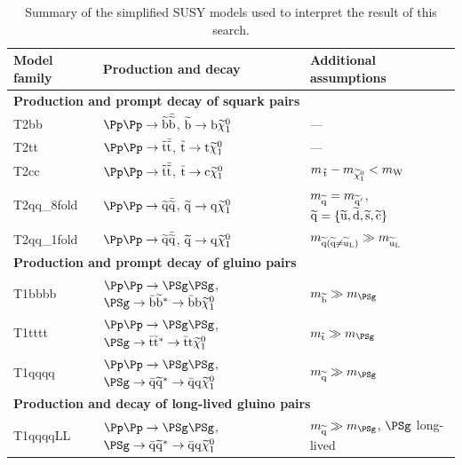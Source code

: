 \begin{table}%
	\centering
	\begin{tabular}{ lll }
		\hline
		Model family
		& Production and decay
		& Additional 
		assumptions                 \\
		\hline
		\multicolumn{3}{l}{\textbf{Production and prompt decay of squark 
		pairs}}           \\
		T2bb
		& $\Pp\Pp \to \sbottom\asbottom$,
		$\mathrm{\widetilde{b}} \to \mathrm{b}\widetilde{\chi}_1^0$
		& 
		---                   \\
		T2tt
		& $\Pp\Pp \to \stopp\astop$,
		$\mathrm{\tilde{t}} \to \mathrm{t}\widetilde{\chi}_1^0$
		& 
		---                      \\
		T2cc
		& $\Pp\Pp \to \stopp\astop$,
		$\mathrm{\tilde{t}} \to \mathrm{c}\widetilde{\chi}_1^0$
		& $m_{\,\mathrm{\tilde{t}}} - m_{\widetilde{\chi}_1^0} < m_\mathrm{W}$      \\
		T2qq\_8fold
		& $\Pp\Pp \to \squark\asquark$,
		$\mathrm{\widetilde{q}} \to \mathrm{q}\widetilde{\chi}_1^0$
		& $m_{\mathrm{\widetilde{q}}} = m_{\mathrm{\widetilde{q}}'}$,
		$\mathrm{\widetilde{q}} = \{ \mathrm{\widetilde{u}}, \mathrm{\widetilde{d}}, \mathrm{\widetilde{s}}, \mathrm{\widetilde{c}} \}$       \\
		T2qq\_1fold
		& $\Pp\Pp \to \squark\asquark$,
		$\mathrm{\widetilde{q}} \to \mathrm{q}\widetilde{\chi}_1^0$
		& $m_{\mathrm{\widetilde{q}} (\mathrm{\widetilde{q}} \neq \mathrm{\widetilde{u}}_{\mathrm L})} \gg m_{\mathrm{\widetilde{u}}_{\mathrm 
		L}}$ \\
		\multicolumn{3}{l}{\textbf{Production and prompt decay of gluino 
		pairs}}           \\
		T1bbbb
		& $\Pp\Pp \to \PSg\PSg$,
		$\PSg\to \bar{\mathrm{b}}\sbottom^* \to 
		\bar{\mathrm{b}}\mathrm{b}\neutralino$
		& $m_{\sbottom} \gg m_{\PSg}$              \\
		T1tttt
		& $\Pp\Pp \to \PSg\PSg$,
		$\PSg\to \bar{\mathrm{t}}\stopp^* \to 
		\bar{\mathrm{t}}\mathrm{t}\neutralino$
		& $m_{\stopp} \gg m_{\PSg}$           	\\                         
		T1qqqq
		& $\Pp\Pp \to \PSg\PSg$,
		$\PSg\to \bar{\mathrm{q}}\squark^* \to 
		\bar{\mathrm{q}}\mathrm{q}\neutralino$
		& $m_{\squark} \gg m_{\PSg}$      \\                           
		\multicolumn{3}{l}{\textbf{Production and decay of long-lived gluino 
		pairs}}       \\
		T1qqqqLL
		& $\Pp\Pp \to \PSg\PSg$,
		$\PSg\to \bar{\mathrm{q}}\squark^* \to
		\bar{\mathrm{q}}\mathrm{q}\neutralino$
		& $m_{\squark} \gg m_{\PSg}$, $\PSg$ long-lived    \\
		\hline
	\end{tabular}
\caption{Summary of the simplified SUSY models used to interpret the result of 
this search.} 
\label{tab:sms}
\end{table}


